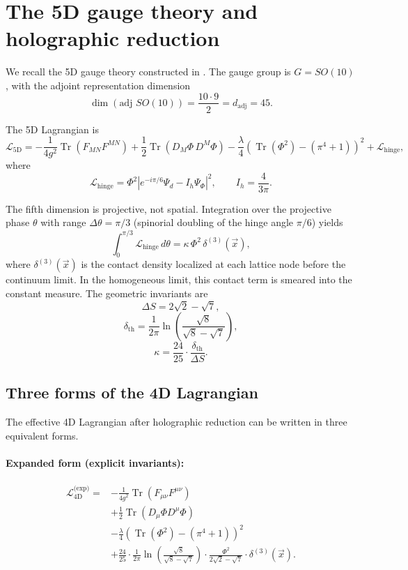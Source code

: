 \documentclass[12pt]{article}
\numberwithin{equation}{section}
\newcommand{\dth}{\delta_{\mathrm{th}}}
\newcommand{\DS}{\Delta S}
\newcommand{\cL}{\mathcal{L}}
\begin{document}
\section{The 5D gauge theory and holographic reduction}

We recall the 5D gauge theory constructed in \cite{blandino2026fano}. The gauge group is \(G = SO(10)\), with the adjoint representation dimension
\[
\dim(\text{adj } SO(10)) = \frac{10 \cdot 9}{2} = d_{\text{adj}} = 45. \tag{1}
\]

The 5D Lagrangian is
\[
\cL_{\text{5D}} = -\frac{1}{4g^2} \operatorname{Tr}(F_{MN}F^{MN}) + \frac{1}{2} \operatorname{Tr}(D_M\Phi\, D^M\Phi) - \frac{\lambda}{4} \left( \operatorname{Tr}(\Phi^2) - (\pi^4+1) \right)^2 + \cL_{\text{hinge}}, \tag{2}
\]
where
\[
\cL_{\text{hinge}} = \Phi^2 \left| e^{-i\pi/6}\Psi_d - I_h \Psi_\Phi \right|^2, \qquad I_h = \frac{4}{3\pi}. \tag{3}
\]

The fifth dimension is projective, not spatial. Integration over the projective phase \(\theta\) with range \(\Delta\theta = \pi/3\) (spinorial doubling of the hinge angle \(\pi/6\)) yields
\begin{equation}\label{eq:hinge_integral}
\int_0^{\pi/3} \cL_{\text{hinge}}\, d\theta = \kappa\, \Phi^2\, \delta^{(3)}(\vec{x}),
\end{equation}
where \(\delta^{(3)}(\vec{x})\) is the contact density localized at each lattice node before the continuum limit. In the homogeneous limit, this contact term is smeared into the constant measure. The geometric invariants are
\[
\DS = 2\sqrt{2} - \sqrt{7}, \tag{5}
\]
\[
\dth = \frac{1}{2\pi} \ln\left( \frac{\sqrt{8}}{\sqrt{8} - \sqrt{7}} \right), \tag{6}
\]
\[
\kappa = \frac{24}{25} \cdot \frac{\dth}{\DS}. \tag{7}
\]

\subsection{Three forms of the 4D Lagrangian}

The effective 4D Lagrangian after holographic reduction can be written in three equivalent forms.

\paragraph{Expanded form (explicit invariants):}
\[
\boxed{
\begin{aligned}
\cL_{\text{4D}}^{\text{(exp)}} = &-\frac{1}{4g^2} \operatorname{Tr}(F_{\mu\nu}F^{\mu\nu}) \\
&+ \frac{1}{2} \operatorname{Tr}(D_\mu\Phi D^\mu\Phi) \\
&- \frac{\lambda}{4} \left( \operatorname{Tr}(\Phi^2) - (\pi^4+1) \right)^2 \\
&+ \frac{24}{25} \cdot \frac{1}{2\pi} \ln\left( \frac{\sqrt{8}}{\sqrt{8} - \sqrt{7}} \right) \cdot \frac{\Phi^2}{2\sqrt{2} - \sqrt{7}} \cdot \delta^{(3)}(\vec{x}).
\end{aligned}
}
\]
\end{document}
